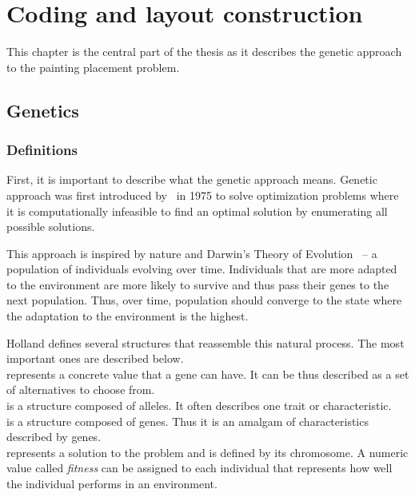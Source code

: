 \chapter{Coding and layout construction}\label{ch:coding-and-layout-construction}

This chapter is the central part of the thesis as it describes the genetic approach to the painting placement problem.


\section{Genetics}\label{sec:genetics}

\subsection{Definitions}\label{subsec:definitions}

First, it is important to describe what the genetic approach means.
Genetic approach was first introduced by~\cite{hollandAdaptationNaturalArtificial1975} in 1975
to solve optimization problems where it is computationally infeasible to
find an optimal solution by enumerating all possible solutions.

This approach is inspired by nature and Darwin’s Theory of Evolution~\cite{TODO}
– a population of individuals evolving over time.
Individuals that are more adapted to the environment are
more likely to survive and thus pass their genes to the next population.
Thus, over time, population should converge to the state where the adaptation to the environment is the highest.

Holland defines several structures that reassemble this natural process.
The most important ones are described below.\\

 represents a concrete value that a gene can have.
It can be thus described as a set of alternatives to choose from. \\

 is a structure composed of alleles.
It often describes one trait or characteristic. \\

 is a structure composed of genes.
Thus it is an amalgam of characteristics described by genes.\\

 represents a solution to the problem and is defined by its chromosome.
A numeric value called \textit{fitness} can be assigned to each individual that represents how well the individual performs in an environment. \\


